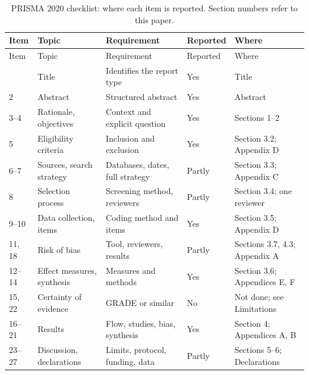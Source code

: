 {\scriptsize\begin{longtable}{@{}l p{3.6cm} p{4.2cm} l p{4.6cm}@{}}
\caption{PRISMA 2020 checklist: where each item is reported. Section numbers refer to this paper.}\label{tab:prismacheck}\\
\toprule Item & Topic & Requirement & Reported & Where \\ \midrule \endfirsthead
\toprule Item & Topic & Requirement & Reported & Where \\ \midrule \endhead
\bottomrule \endfoot
1 & Title & Identifies the report type & Yes & Title \\
2 & Abstract & Structured abstract & Yes & Abstract \\
3--4 & Rationale, objectives & Context and explicit question & Yes & Sections 1--2 \\
5 & Eligibility criteria & Inclusion and exclusion & Yes & Section 3.2; Appendix D \\
6--7 & Sources, search strategy & Databases, dates, full strategy & Partly & Section 3.3; Appendix C \\
8 & Selection process & Screening method, reviewers & Partly & Section 3.4; one reviewer \\
9--10 & Data collection, items & Coding method and items & Yes & Section 3.5; Appendix D \\
11, 18 & Risk of bias & Tool, reviewers, results & Partly & Sections 3.7, 4.3; Appendix A \\
12--14 & Effect measures, synthesis & Measures and methods & Yes & Section 3.6; Appendices E, F \\
15, 22 & Certainty of evidence & GRADE or similar & No & Not done; see Limitations \\
16--21 & Results & Flow, studies, bias, synthesis & Yes & Section 4; Appendices A, B \\
23--27 & Discussion, declarations & Limits, protocol, funding, data & Partly & Sections 5--6; Declarations \\
\end{longtable}}
